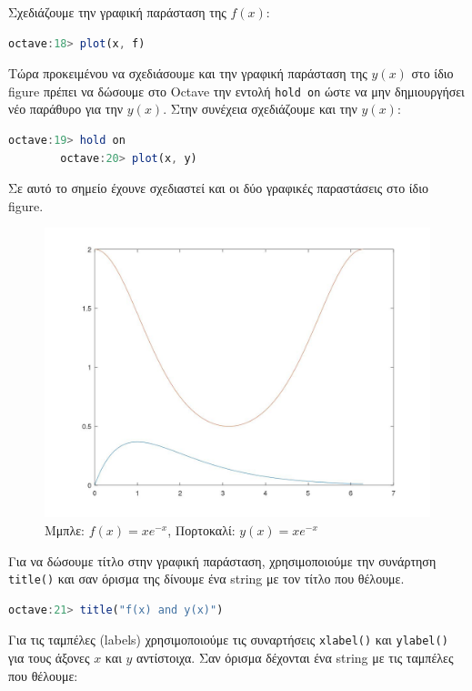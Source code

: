 \documentclass{article}
\begin{document}
Σχεδιάζουμε την γραφική παράσταση της $f(x)$:

\begin{lstlisting}[language=octave]
        octave:18> plot(x, f)
\end{lstlisting}

Τώρα προκειμένου να σχεδιάσουμε και την γραφική παράσταση της $y(x)$ στο ίδιο
figure πρέπει να δώσουμε στο Octave την εντολή \lstinline{hold on} ώστε να μην
δημιουργήσει νέο παράθυρο για την $y(x)$. Στην συνέχεια σχεδιάζουμε και την $y(x)$:

\begin{lstlisting}[language=octave]
        octave:19> hold on
        octave:20> plot(x, y)
\end{lstlisting}

Σε αυτό το σημείο έχουνε σχεδιαστεί και οι δύο γραφικές παραστάσεις στο ίδιο figure.

\begin{figure}[H]
        \centering
        \includegraphics[width=\linewidth]{res/fig2.jpg}
        \caption{Μμπλε: $f(x) = xe^{-x}$, Πορτοκαλί: $y(x) = xe^{-x}$}
\end{figure}

Για να δώσουμε τίτλο στην γραφική παράσταση, χρησιμοποιούμε την συνάρτηση
\lstinline{title()} και σαν όρισμα της δίνουμε ένα string με τον τίτλο που θέλουμε.

\begin{lstlisting}[language=octave]
        octave:21> title("f(x) and y(x)")
\end{lstlisting}

Για τις ταμπέλες (labels) χρησιμοποιούμε τις συναρτήσεις \lstinline{xlabel()}
και \lstinline{ylabel()} για τους άξονες $x$ και $y$ αντίστοιχα. Σαν όρισμα δέχονται
ένα string με τις ταμπέλες που θέλουμε:
\end{document}
